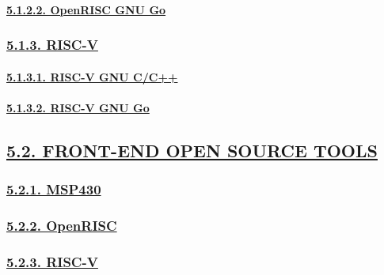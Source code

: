 \documentclass[
]{article}
\begin{document}
\hypertarget{openrisc-gnu-go}{%
\paragraph{\texorpdfstring{\protect\hyperlink{openrisc-gnu-go-1}{5.1.2.2.
OpenRISC GNU Go}}{5.1.2.2. OpenRISC GNU Go}}\label{openrisc-gnu-go}}

\hypertarget{risc-v-1}{%
\subsubsection{\texorpdfstring{\protect\hyperlink{risc-v-4}{5.1.3.
RISC-V}}{5.1.3. RISC-V}}\label{risc-v-1}}

\hypertarget{risc-v-gnu-cc}{%
\paragraph{\texorpdfstring{\protect\hyperlink{risc-v-gnu-cc-1}{5.1.3.1.
RISC-V GNU C/C++}}{5.1.3.1. RISC-V GNU C/C++}}\label{risc-v-gnu-cc}}

\hypertarget{risc-v-gnu-go}{%
\paragraph{\texorpdfstring{\protect\hyperlink{risc-v-gnu-go-1}{5.1.3.2.
RISC-V GNU Go}}{5.1.3.2. RISC-V GNU Go}}\label{risc-v-gnu-go}}

\hypertarget{front-end-open-source-tools-1}{%
\subsection{\texorpdfstring{\protect\hyperlink{front-end-open-source-tools-3}{5.2.
FRONT-END OPEN SOURCE
TOOLS}}{5.2. FRONT-END OPEN SOURCE TOOLS}}\label{front-end-open-source-tools-1}}

\hypertarget{msp430-2}{%
\subsubsection{\texorpdfstring{\protect\hyperlink{msp430-5}{5.2.1.
MSP430}}{5.2.1. MSP430}}\label{msp430-2}}

\hypertarget{openrisc-2}{%
\subsubsection{\texorpdfstring{\protect\hyperlink{openrisc-5}{5.2.2.
OpenRISC}}{5.2.2. OpenRISC}}\label{openrisc-2}}

\hypertarget{risc-v-2}{%
\subsubsection{\texorpdfstring{\protect\hyperlink{risc-v-5}{5.2.3.
RISC-V}}{5.2.3. RISC-V}}\label{risc-v-2}}
\end{document}
